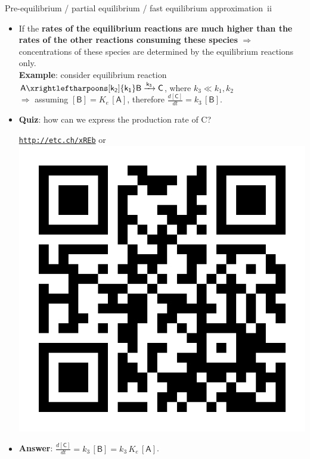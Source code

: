\begin{frame}{Pre-equilibrium / partial equilibrium / fast equilibrium approximation \,ii}
	\small
	\begin{itemize}
	   	\item[(ii)] If the {\bf  rates of the equilibrium reactions are much higher than the rates of the other reactions consuming 
				these species} $\Rightarrow$  concentrations of these species are determined by the equilibrium reactions only.\\
			{\bf Example}: consider equilibrium reaction $\mathsf{A \xrightleftharpoons[k_2]{k_1} B \xrightarrow{k_3} C}$, where $k_3 \ll k_1, k_2$ \\
			$\Rightarrow$  assuming $\mathsf{[B]} = K_e \, \mathsf{[A]}$, therefore $\tfrac{d\mathsf{[C]}}{dt} = k_3 \, \mathsf{[B]}$.		\\[10pt]
		\item \alert{\bf Quiz}: how can we express the production rate of C?		
		\begin{center}
			\href{http://etc.ch/xREb}{\textcolor{indigo(dye)}{\tt http://etc.ch/xREb}} \quad or \quad 
			\includegraphics[height=0.18\columnwidth]{figures/chemical-kinetics/polls.png}
		\end{center}
		\hiddenpause
		\vskip 10pt
		\item  {\bf Answer}: $\tfrac{d\mathsf{[C]}}{dt} = k_3 \, \mathsf{[B]} = k_3\, K_e \, \mathsf{[A]}$.	
		\end{itemize}	
\end{frame}
%
%
%

